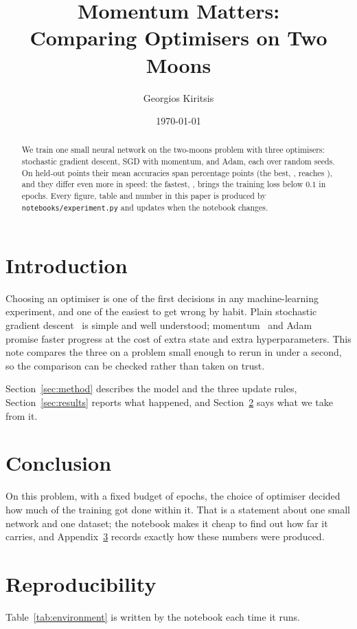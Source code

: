 \documentclass[11pt]{article}
\title{Momentum Matters:\\ Comparing Optimisers on Two Moons}
\author{Georgios Kiritsis}
\date{\today}
\begin{document}
\maketitle

\begin{abstract}
We train one small neural network on the two-moons problem with three optimisers:
stochastic gradient descent, SGD with momentum, and Adam, each over  random
seeds. On  held-out points their mean accuracies span 
percentage points (the best, , reaches ), and they differ even
more in speed: the fastest, , brings the training loss below $0.1$ in
 epochs. Every figure, table and number in this paper is produced by
\texttt{notebooks/experiment.py} and updates when the notebook changes.
\end{abstract}

\section{Introduction}
\label{sec:introduction}
Choosing an optimiser is one of the first decisions in any machine-learning experiment, and
one of the easiest to get wrong by habit. Plain stochastic gradient descent~\cite{robbins1951}
is simple and well understood; momentum~\cite{polyak1964} and Adam~\cite{kingma2015} promise
faster progress at the cost of extra state and extra hyperparameters. This note compares the
three on a problem small enough to rerun in under a second, so the comparison can be checked
rather than taken on trust.

Section~\ref{sec:method} describes the model and the three update rules,
Section~\ref{sec:results} reports what happened, and Section~\ref{sec:conclusion} says what
we take from it.




\section{Conclusion}
\label{sec:conclusion}
On this problem, with a fixed budget of  epochs, the choice of optimiser
decided how much of the training got done within it. That is a statement about one small
network and one dataset; the notebook
makes it cheap to find out how far it carries, and Appendix~\ref{app:reproducibility}
records exactly how these numbers were produced.




\appendix
\section{Reproducibility}
\label{app:reproducibility}
Table~\ref{tab:environment} is written by the notebook each time it runs.

\begin{table}[ht]
  \centering
  \nbenv
  \caption{The run that produced the results in this paper.}
  \label{tab:environment}
\end{table}

\
\end{document}

